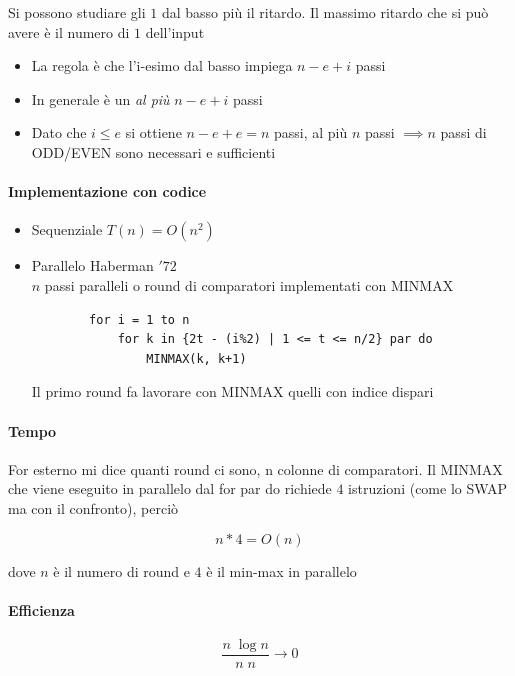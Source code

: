 Si possono studiare gli $1$ dal basso più il ritardo. Il massimo ritardo che si può avere è il numero di $1$ dell'input
\begin{itemize}
    \item La regola è che l'i-esimo dal basso impiega $n - e + i$ passi
    \item In generale è un \textit{al più} $n - e + i$ passi
    \item Dato che $i \leq e$ si ottiene $n - e + e = n$ passi, al più $n$ passi $\implies n$ passi di ODD/EVEN sono necessari e sufficienti
\end{itemize}

\paragraph{Implementazione con codice}
\begin{itemize}
    \item Sequenziale $T(n) = O(n^2)$
    \item Parallelo Haberman $'72$\\
    $n$ passi paralleli o round di comparatori implementati con MINMAX
    \begin{lstlisting}
        for i = 1 to n
            for k in {2t - (i%2) | 1 <= t <= n/2} par do
                MINMAX(k, k+1)
    \end{lstlisting}

    Il primo round fa lavorare con MINMAX quelli con indice dispari
\end{itemize}

\paragraph{Tempo}
For esterno mi dice quanti round ci sono, n colonne di comparatori. Il MINMAX che viene eseguito in parallelo dal for par do richiede $4$ istruzioni (come lo SWAP ma con il confronto), perciò

$$n * 4 = O(n)$$

dove $n$ è il numero di round e $4$ è il min-max in parallelo

\paragraph{Efficienza}
$$\frac{n\;\log n}{n\;n} \rightarrow 0 $$

